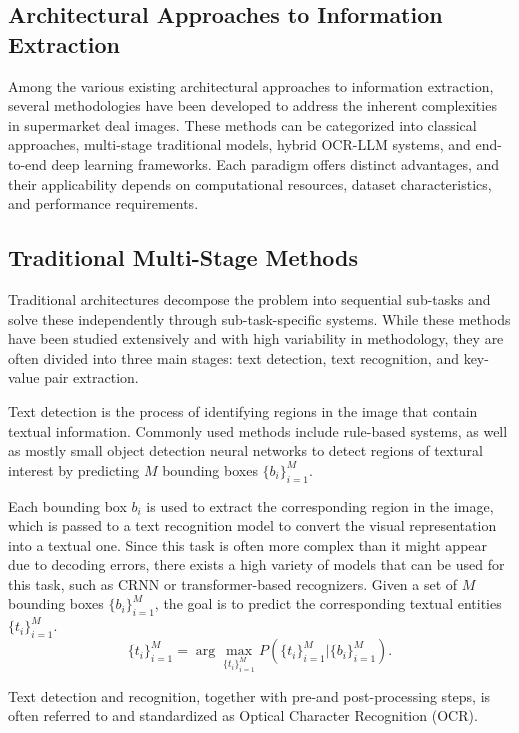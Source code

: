 \documentclass[11pt]{article}
\begin{document}
\subsection{Architectural Approaches to Information Extraction}
Among the various existing architectural approaches to information extraction, several methodologies have been developed to address the inherent complexities in supermarket deal images. These methods can be categorized into classical approaches, multi-stage traditional models, hybrid OCR-LLM systems, and end-to-end deep learning frameworks. Each paradigm offers distinct advantages, and their applicability depends on computational resources, dataset characteristics, and performance requirements.

\subsection{Traditional Multi-Stage Methods}
Traditional architectures decompose the problem into sequential sub-tasks and solve these independently through sub-task-specific systems. While these methods have been studied extensively  %
and with high variability in methodology, they are often divided into three main stages: text detection, text recognition, and key-value pair extraction.

 Text detection is the process of identifying regions in the image that contain textual information. Commonly used methods include rule-based systems, as well as mostly small object detection neural networks to detect regions of textural interest by predicting $M$ bounding boxes $\{b_i\}_{i=1}^{M}$.

 Each bounding box $b_i$ is used to extract the corresponding region in the image, which is passed to a text recognition model to convert the visual representation into a textual one. Since this task is often more complex than it might appear due to decoding errors, there exists a high variety of models that can be used for this task, such as CRNN \cite{shi2016crnn} or transformer-based recognizers.
Given a set of $M$ bounding boxes $\{b_i\}_{i=1}^{M}$, the goal is to predict the corresponding textual entities $\{t_i\}_{i=1}^{M}$.
\begin{equation}
    \{t_i\}_{i=1}^{M} = \arg\max_{\{t_i\}_{i=1}^{M}} P(\{t_i\}_{i=1}^{M} | \{b_i\}_{i=1}^{M}).
\end{equation}

Text detection and recognition, together with pre-and post-processing steps, is often referred to and standardized as Optical Character Recognition (OCR).
\end{document}
